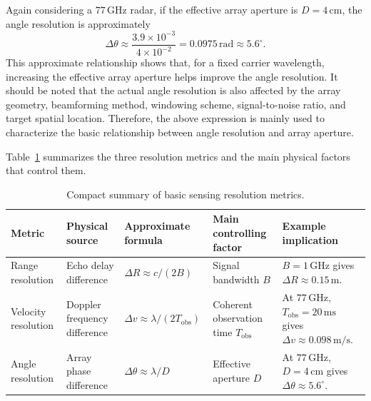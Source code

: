 Again considering a \(77\,\mathrm{GHz}\) radar, if the effective array aperture
is \(D=4\,\mathrm{cm}\), the angle resolution is approximately
\begin{equation}
    \Delta \theta
    \approx
    \frac{3.9\times10^{-3}}{4\times10^{-2}}
    =
    0.0975\,\mathrm{rad}
    \approx
    5.6^\circ.
    \label{eq:angle_resolution_example}
\end{equation}
This approximate relationship shows that, for a fixed carrier wavelength,
increasing the effective array aperture helps improve the angle resolution.
It should be noted that the actual angle resolution is also affected by the
array geometry, beamforming method, windowing scheme, signal-to-noise ratio,
and target spatial location.
Therefore, the above expression is mainly used to characterize the basic
relationship between angle resolution and array aperture.

Table~\ref{tab:sensing_resolution_summary} summarizes the three resolution
metrics and the main physical factors that control them.
\begin{table}[htbp]
    \centering
    \caption{Compact summary of basic sensing resolution metrics.}
    \label{tab:sensing_resolution_summary}
    \small
    \renewcommand{\arraystretch}{1.25}
    \begin{tabularx}{\textwidth}{
        >{\raggedright\arraybackslash}p{}
        >{\raggedright\arraybackslash}p{}
        >{\centering\arraybackslash}p{}
        >{\raggedright\arraybackslash}p{}
        >{\raggedright\arraybackslash}X
    }
        \toprule
        Metric & Physical source & Approximate formula & Main controlling factor & Example implication \\
        \midrule
        Range resolution
        & Echo delay difference
        & \(\Delta R \approx c/(2B)\)
        & Signal bandwidth \(B\)
        & \(B=1\,\mathrm{GHz}\) gives \(\Delta R\approx0.15\,\mathrm{m}\). \\
        Velocity resolution
        & Doppler frequency difference
        & \(\Delta v \approx \lambda/(2T_{\mathrm{obs}})\)
        & Coherent observation time \(T_{\mathrm{obs}}\)
        & At \(77\,\mathrm{GHz}\), \(T_{\mathrm{obs}}=20\,\mathrm{ms}\) gives \(\Delta v\approx0.098\,\mathrm{m/s}\). \\
        Angle resolution
        & Array phase difference
        & \(\Delta\theta \approx \lambda/D\)
        & Effective aperture \(D\)
        & At \(77\,\mathrm{GHz}\), \(D=4\,\mathrm{cm}\) gives \(\Delta\theta\approx5.6^\circ\). \\
        \bottomrule
    \end{tabularx}
\end{table}

